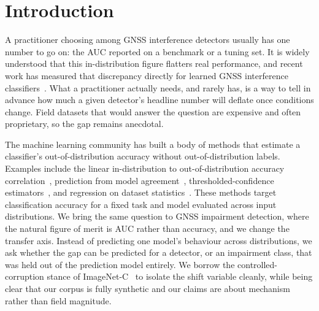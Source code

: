 \documentclass[conference]{IEEEtran}
\begin{document}
\begin{abstract}
2024 campaign the cross-detector prediction holds on real data ($R^2 = 0.11$,
$p = 0.009$), while the cross-class prediction and a smaller, underpowered single-day
capture do not. On SatGrid, whose spoofer power sweep supplies the calibrated
severity axis the other field sets lack, in-distribution AUC overstates higher-severity
AUC across two independent recording sessions, by up to $0.22$ and to the point of sign
inversion at maximum spoofer power; across the eight pooled detector-by-session gaps the
in-distribution AUC and the realised gap are perfectly rank-correlated (Spearman
$\rho = 1.0$), the predicted direction, though four correlated detectors and a single
attack class leave the formal leave-one-detector-out predictor underpowered. So the mechanism survives contact with real data on the axis each
corpus can support, at a smaller magnitude than in simulation. We release the testbed,
a software-receiver front end that turns raw IQ into the correlator features the
signal-quality detector needs, the real-data ingest adapters, and the pre-registered
protocol.
\end{abstract}

\section{Introduction}
A practitioner choosing among GNSS interference detectors usually has one number to
go on: the AUC reported on a benchmark or a tuning set. It is widely understood
that this in-distribution figure flatters real performance, and recent work has
measured that discrepancy directly for learned GNSS interference
classifiers~\cite{discrepancies}. What a practitioner actually needs, and rarely
has, is a way to tell in advance how much a given detector's headline number will
deflate once conditions change. Field datasets that would answer the question are
expensive and often proprietary, so the gap remains anecdotal.

The machine learning community has built a body of methods that estimate a
classifier's out-of-distribution accuracy without out-of-distribution labels.
Examples include the linear in-distribution to out-of-distribution accuracy
correlation~\cite{aotl}, prediction from model agreement~\cite{agreement,gde},
thresholded-confidence estimators~\cite{atc}, and regression on dataset
statistics~\cite{denzheng,doc}. These methods target classification accuracy for a
fixed task and model evaluated across input distributions. We bring the same
question to GNSS impairment detection, where the natural figure of merit is AUC
rather than accuracy, and we change the transfer axis. Instead of predicting one
model's behaviour across distributions, we ask whether the gap can be predicted
for a detector, or an impairment class, that was held out of the prediction model
entirely. We borrow the controlled-corruption stance of ImageNet-C~\cite{imagenetc}
to isolate the shift variable cleanly, while being clear that our corpus is fully
synthetic and our claims are about mechanism rather than field magnitude.
\end{document}
